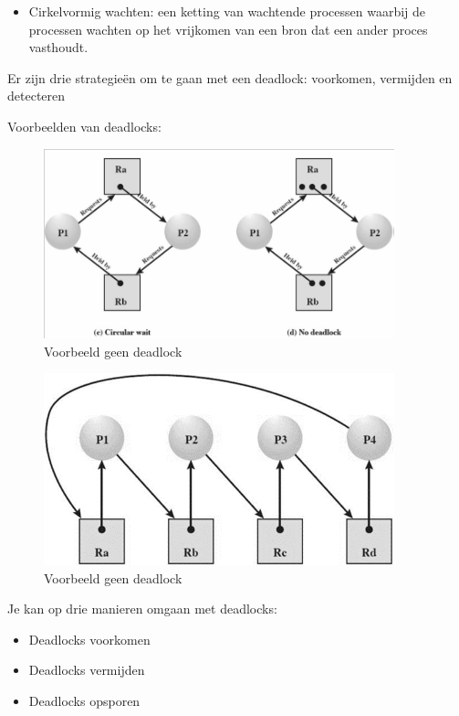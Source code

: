 \begin{itemize}
\item Cirkelvormig wachten: een ketting van wachtende processen waarbij de processen wachten op het vrijkomen van een bron dat een ander proces vasthoudt.
\end{itemize}

Er zijn drie strategieën om te gaan met een deadlock: voorkomen, vermijden en detecteren

Voorbeelden van deadlocks:



\begin{figure}[htp]
    \centering
            \includegraphics[width=4in]{img/deadlockexamples.png}
        \caption{Voorbeeld geen deadlock}
    \label{fig:Voorbeeld geen deadlock}
\end{figure}

\begin{figure}[htp]
    \centering
            \includegraphics[width=4in]{img/deadlockomgaan.png}
        \caption{Voorbeeld geen deadlock}
    \label{fig:Voorbeeld geen deadlock}
\end{figure}

Je kan op drie manieren omgaan met deadlocks:

\begin{itemize}
    \item Deadlocks voorkomen
    \item Deadlocks vermijden
    \item Deadlocks opsporen
\end{itemize}

